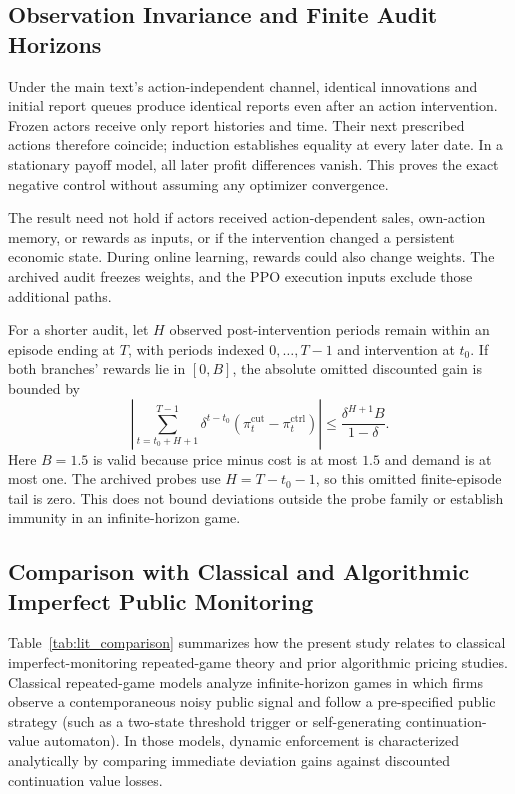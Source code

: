 \documentclass{article}
\begin{document}
\subsection{Observation Invariance and Finite Audit Horizons}

Under the main text's action-independent channel, identical innovations and initial report queues produce identical reports even after an action intervention. Frozen actors receive only report histories and time. Their next prescribed actions therefore coincide; induction establishes equality at every later date. In a stationary payoff model, all later profit differences vanish. This proves the exact negative control without assuming any optimizer convergence.

The result need not hold if actors received action-dependent sales, own-action memory, or rewards as inputs, or if the intervention changed a persistent economic state. During online learning, rewards could also change weights. The archived audit freezes weights, and the PPO execution inputs exclude those additional paths.

For a shorter audit, let $H$ observed post-intervention periods remain within an episode ending at $T$, with periods indexed $0,\ldots,T-1$ and intervention at $t_0$. If both branches' rewards lie in $[0, B]$, the absolute omitted discounted gain is bounded by
\[
\left| \sum_{t=t_0+H+1}^{T-1} \delta^{t-t_0} (\pi_t^{\mathrm{cut}} - \pi_t^{\mathrm{ctrl}}) \right| \leq \frac{\delta^{H+1} B}{1-\delta}.
\]
Here $B = 1.5$ is valid because price minus cost is at most $1.5$ and demand is at most one. The archived probes use $H = T - t_0 - 1$, so this omitted finite-episode tail is zero. This does not bound deviations outside the probe family or establish immunity in an infinite-horizon game.

\subsection{Comparison with Classical and Algorithmic Imperfect Public Monitoring}

Table~\ref{tab:lit_comparison} summarizes how the present study relates to classical imperfect-monitoring repeated-game theory and prior algorithmic pricing studies. Classical repeated-game models \citep{green1984noncooperative, abreu1990toward, fudenberg1994folk} analyze infinite-horizon games in which firms observe a contemporaneous noisy public signal and follow a pre-specified public strategy (such as a two-state threshold trigger or self-generating continuation-value automaton). In those models, dynamic enforcement is characterized analytically by comparing immediate deviation gains against discounted continuation value losses.
\end{document}
